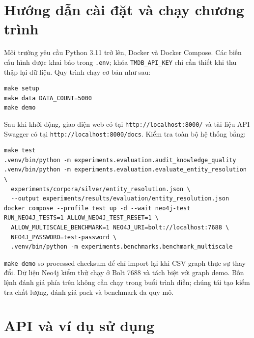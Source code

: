 \chapter{Hướng dẫn cài đặt và chạy chương trình}

Môi trường yêu cầu Python 3.11 trở lên, Docker và Docker Compose. Các biến cấu
hình được khai báo trong \texttt{.env}; khóa \texttt{TMDB\_API\_KEY} chỉ cần thiết khi thu thập
lại dữ liệu. Quy trình chạy cơ bản như sau:

\begin{Verbatim}[fontsize=\scriptsize,frame=single]
make setup
make data DATA_COUNT=5000
make demo
\end{Verbatim}

Sau khi khởi động, giao diện web có tại \texttt{http://localhost:8000/} và tài liệu API
Swagger có tại \texttt{http://localhost:8000/docs}. Kiểm tra toàn bộ hệ thống bằng:

\begin{Verbatim}[fontsize=\scriptsize,frame=single]
make test
.venv/bin/python -m experiments.evaluation.audit_knowledge_quality
.venv/bin/python -m experiments.evaluation.evaluate_entity_resolution \
  experiments/corpora/silver/entity_resolution.json \
  --output experiments/results/evaluation/entity_resolution.json
docker compose --profile test up -d --wait neo4j-test
RUN_NEO4J_TESTS=1 ALLOW_NEO4J_TEST_RESET=1 \
  ALLOW_MULTISCALE_BENCHMARK=1 NEO4J_URI=bolt://localhost:7688 \
  NEO4J_PASSWORD=test-password \
  .venv/bin/python -m experiments.benchmarks.benchmark_multiscale
\end{Verbatim}

\texttt{make demo} so processed checksum để chỉ import lại khi CSV graph thực sự thay đổi.
Dữ liệu Neo4j kiểm thử chạy ở Bolt 7688 và tách biệt với graph demo. Bốn lệnh đánh
giá phía trên không cần chạy trong buổi trình diễn; chúng tái tạo kiểm tra chất
lượng, đánh giá
pack và benchmark đa quy mô.

\chapter{API và ví dụ sử dụng}

